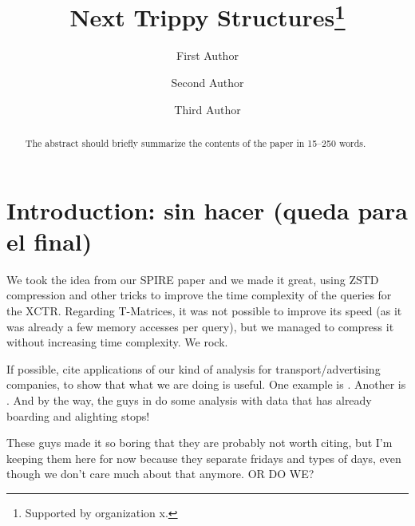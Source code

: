 \documentclass[runningheads]{llncs}
\newcommand{\acumm}{T-Matrices} %
\newcommand{\ctr}{XCTR}
\begin{document}
%
\title{Next Trippy Structures\thanks{Supported by organization x.}}
%
%
\author{First Author \and
Second Author \and
Third Author}
%
%
%
\maketitle              %
%
\begin{abstract}
The abstract should briefly summarize the contents of the paper in
15--250 words.

\end{abstract}
%
%
%
\section{Introduction: sin hacer (queda para el final)}
We took the idea from our SPIRE paper and we made it great, using ZSTD compression and other tricks to improve the time complexity of the queries for the \ctr. Regarding \acumm, it was not possible to improve its speed (as it was already a few memory accesses per query), but we managed to compress it without increasing time complexity. We rock.

If possible, cite applications of our kind of analysis for transport/advertising companies, to show that what we are doing is useful. One example is \cite{tu2018spatial}. Another is \cite{zhang2017targeted}. And by the way, the guys in \cite{weng2018mining} do some analysis with data that has already boarding and alighting stops!

These guys \cite{wang2014aggregated} made it so boring that they are probably not worth citing, but I'm keeping them here for now because they separate fridays and types of days, even though we don't care much about that anymore. OR DO WE?
\end{document}
